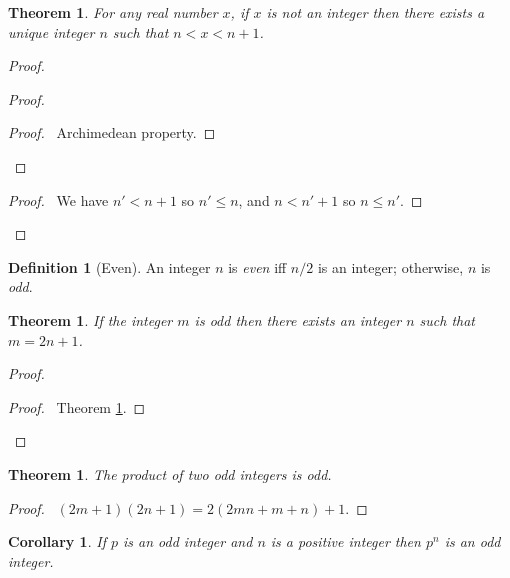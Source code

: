\documentclass{book}
\let\qed\relax
\newtheorem{cor}{Corollary}[ax]
\newtheorem{thm}[ax]{Theorem}
\theoremstyle{definition}
\newtheorem{df}[ax]{Definition}
\begin{document}
\begin{thm}
\label{thm:sandwich}
For any real number $x$, if $x$ is not an integer then there exists a unique integer $n$ such that $n < x < n + 1$.
\end{thm}

\begin{proof}
\pf
{}
\begin{proof}
	\begin{proof}
		\pf\ Archimedean property.
	\end{proof}
\end{proof}
\begin{proof}
	\pf\ We have $n' < n+1$ so $n' \leq n$, and $n < n' + 1$ so $n \leq n'$.
\end{proof}
\qed
\end{proof}

\begin{df}[Even]
An integer $n$ is \emph{even} iff $n/2$ is an integer; otherwise, $n$ is \emph{odd}.
\end{df}

\begin{thm}
If the integer $m$ is odd then there exists an integer $n$ such that $m = 2n+1$.
\end{thm}

\begin{proof}
\pf
{}
\begin{proof}
	\pf\ Theorem \ref{thm:sandwich}.
\end{proof}
\qed
\end{proof}

\begin{thm}
\label{thm:product_odd}
The product of two odd integers is odd.
\end{thm}

\begin{proof}
\pf\ $(2m+1)(2n+1) = 2(2mn + m + n) + 1$. \qed
\end{proof}

\begin{cor}
If $p$ is an odd integer and $n$ is a positive integer then $p^n$ is an odd integer.
\end{cor}
\end{document}

